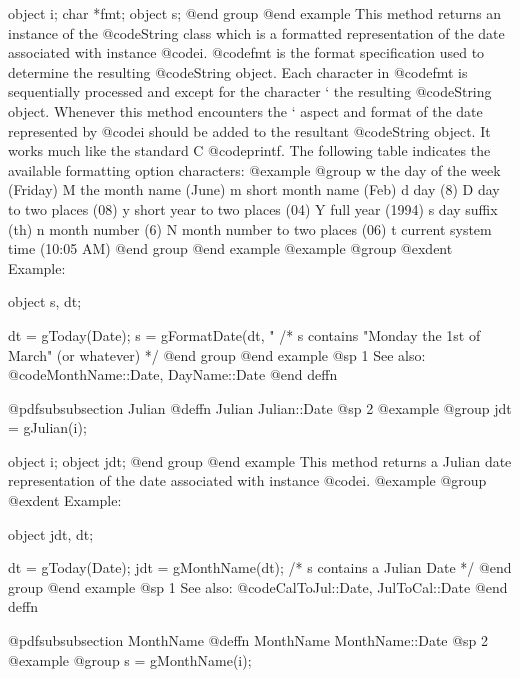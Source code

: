 object  i;
char    *fmt;
object  s;
@end group
@end example
This method returns an instance of the @code{String} class which is a
formatted representation of the date associated with instance @code{i}.
@code{fmt} is the format specification used to determine the resulting
@code{String} object.  Each character in @code{fmt} is sequentially
processed and except for the character `%
the resulting @code{String} object.  Whenever this method encounters
the `%
aspect and format of the date represented by @code{i} should be added to
the resultant @code{String} object.  It works much like the standard C
@code{printf}.  The following table indicates the available formatting option
characters:
@example
@group
w       the day of the week (Friday)
M       the month name (June)
m       short month name (Feb)
d       day (8)
D       day to two places (08)
y       short year to two places (04)
Y       full year (1994)
s       day suffix (th)
n       month number (6)
N       month number to two places (06)
t       current system time (10:05 AM)
@end group
@end example
@example
@group
@exdent Example:

object  s, dt;

dt = gToday(Date);
s = gFormatDate(dt, "%
/*  s contains "Monday the 1st of March" (or whatever)  */
@end group
@end example
@sp 1
See also:  @code{MonthName::Date, DayName::Date}
@end deffn










@pdfsubsubsection {Julian}
@deffn {Julian} Julian::Date
@sp 2
@example
@group
jdt = gJulian(i);

object  i;
object  jdt;
@end group
@end example
This method returns a Julian date representation of the date
associated with instance @code{i}.
@example
@group
@exdent Example:

object  jdt, dt;

dt = gToday(Date);
jdt = gMonthName(dt);   /*  s contains a Julian Date  */
@end group
@end example
@sp 1
See also:  @code{CalToJul::Date, JulToCal::Date}
@end deffn








@pdfsubsubsection {MonthName}
@deffn {MonthName} MonthName::Date
@sp 2
@example
@group
s = gMonthName(i);

